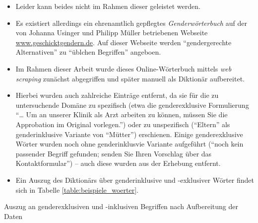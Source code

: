 \documentclass[12pt, 
    twoside=false, 
    bibliography=totoc, 
    numbers=endperiod, 
    headings=normal, 
    toc=chapterentrydotfill
    ]{scrbook}
\begin{document}
\begin{itemize}
    \item Leider kann beides nicht im Rahmen dieser geleistet werden. 
    \item Es existiert allerdings ein ehrenamtlich gepflegtes \emph{Genderwörterbuch} auf der von Johanna Usinger und Philipp Müller betriebenen Webseite \url{www.geschicktgendern.de}. Auf dieser Webseite werden \enquote{gendergerechte Alternativen} zu \enquote{üblchen Begriffen} angeboen.
    \item Im Rahmen dieser Arbeit wurde dieses Online-Wörterbuch mittels \emph{web scraping} \parencite{wickham_2016} zunächst abgegriffen und später manuell als Diktionär aufbereitet.
    \item Hierbei wurden auch zahlreiche Einträge entfernt, da sie für die zu untersuchende Domäne zu spezifisch (etwa die genderexklusive Formulierung \enquote{… Um an unserer Klinik als Arzt arbeiten zu können, müssen Sie die Approbation im Original vorlegen.}) oder zu unspezifisch (\enquote{Eltern} als genderinklusive Variante von \enquote{Mütter}) erschienen. Einige genderexklusive Wörter wurden noch ohne genderinklusvie Variante aufgeführt (\enquote{noch kein passender Begriff gefunden; senden Sie Ihren Vorschlag über das Kontaktformular}) -- auch diese wurden aus der Erhebung entfernt.
    \item Ein Auszug des Diktionärs über genderinklusive und -exklusiver Wörter findet sich in Tabelle \ref{table:beispiele_woerter}.
\end{itemize}

\begin{table}[htb]
    \centering
    \caption[Auszug an genderexklusiven und -inklusiven Begriffen nach Aufbereitung der Daten]{Auszug an genderexklusiven und -inklusiven Begriffen nach Aufbereitung der Daten}
    
    \label{table:beispiele_woerter}
\end{table}
\end{document}
